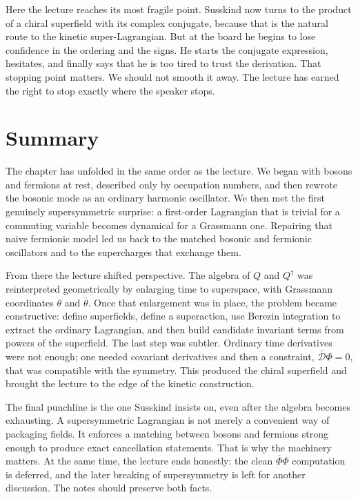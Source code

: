 Here the lecture reaches its most fragile point. Susskind now turns to the product of a chiral superfield with its complex conjugate, because that is the natural route to the kinetic super-Lagrangian. But at the board he begins to lose confidence in the ordering and the signs. He starts the conjugate expression, hesitates, and finally says that he is too tired to trust the derivation. That stopping point matters. We should not smooth it away. The lecture has earned the right to stop exactly where the speaker stops.

\section{Summary}

The chapter has unfolded in the same order as the lecture. We began with bosons and fermions at rest, described only by occupation numbers, and then rewrote the bosonic mode as an ordinary harmonic oscillator. We then met the first genuinely supersymmetric surprise: a first-order Lagrangian that is trivial for a commuting variable becomes dynamical for a Grassmann one. Repairing that naive fermionic model led us back to the matched bosonic and fermionic oscillators and to the supercharges that exchange them.

From there the lecture shifted perspective. The algebra of \(Q\) and \(Q^\dagger\) was reinterpreted geometrically by enlarging time to superspace, with Grassmann coordinates \(\theta\) and \(\bar\theta\). Once that enlargement was in place, the problem became constructive: define superfields, define a superaction, use Berezin integration to extract the ordinary Lagrangian, and then build candidate invariant terms from powers of the superfield. The last step was subtler. Ordinary time derivatives were not enough; one needed covariant derivatives and then a constraint, \(\bar{\mathcal D}\Phi=0\), that was compatible with the symmetry. This produced the chiral superfield and brought the lecture to the edge of the kinetic construction.

The final punchline is the one Susskind insists on, even after the algebra becomes exhausting. A supersymmetric Lagrangian is not merely a convenient way of packaging fields. It enforces a matching between bosons and fermions strong enough to produce exact cancellation statements. That is why the machinery matters. At the same time, the lecture ends honestly: the clean \(\bar\Phi\Phi\) computation is deferred, and the later breaking of supersymmetry is left for another discussion. The notes should preserve both facts.